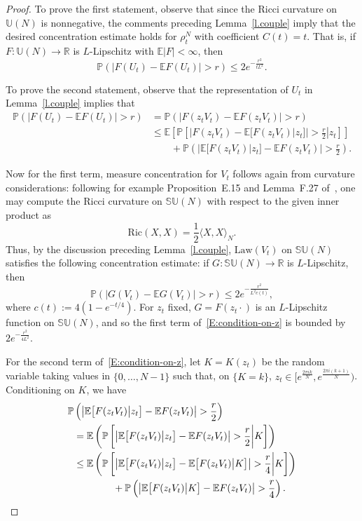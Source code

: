\documentclass[11pt]{article}
\theoremstyle{definition}
\numberwithin{equation}{section}
\numberwithin{figure}{section}
\numberwithin{table}{section}
\newcommand{\Unitary}[1]{\mathbb{U}\left(#1\right)}
\newcommand{\SUnitary}[1]{\mathbb{SU}\left(#1\right)}
\newcommand{\R}{\mathbb{R}}
\newcommand{\E}{\mathbb{E}}
\newcommand{\Prob}{\mathbb{P}}
\begin{document}
\begin{proof}
To prove the first statement, observe that since the Ricci curvature on $\Unitary{N}$ is nonnegative, the comments preceding Lemma~\ref{l.couple} imply that the desired concentration estimate holds for $\rho_t^N$ with coefficient $C(t)=t$. That is, if $F:\Unitary{N}\to\R$ is $L$-Lipschitz with $\mathbb{E}|F|<\infty$, then
\[
\Prob(|F(U_t)-\E F(U_t)|>r)\le 2e^{-\frac{r^2}{tL^2}}.
\]

To prove the second statement, observe that the representation of $U_t$ in Lemma~\ref{l.couple} implies that
\begin{equation}
\begin{split}\label{E:condition-on-z}
\Prob\left(|F(U_t)-\E F(U_t)|>r\right) &=\Prob\left(|F(z_tV_t)-\E F(z_tV_t)|>r\right)\\
&\le\E\left[\Prob\left[\left.\Big|F(z_tV_t)-\E\big[F(z_tV_t)\big|z_t\big]\Big|>\frac{r}{2}\right|z_t\right]\right] \\
&\qquad +\Prob\left(\left|\E\big[F(z_tV_t)\big|z_t\big]-\E F(z_tV_t)\right|>\frac{r}{2}\right).
\end{split}
\end{equation}

Now for the first term, measure concentration for $V_t$ follows again from curvature considerations: following for example Proposition~E.15 and Lemma~F.27 of~\cite{AGZ}, one may compute the Ricci curvature on $\SUnitary{N}$ with respect to the given inner product as
\[
\mathrm{Ric}(X,X) = \frac{1}{2}\langle X,X\rangle_N.
\]
Thus, by the discussion preceding Lemma~\ref{l.couple}, $\mathrm{Law}(V_t)$ on $\SUnitary{N}$ satisfies the following concentration estimate: if $G:\SUnitary{N}\to\R$ is $L$-Lipschitz, then
\[
\Prob(|G(V_t)-\E G(V_t)|>r)\le 2e^{-\frac{r^2}{L^2c(t)}},
\]
where $c(t):=4(1-e^{-t/4})$. For $z_t$ fixed, $G=F(z_t\cdot)$ is an $L$-Lipschitz function on $\SUnitary{N}$, and so the first term of~\eqref{E:condition-on-z} is bounded by $2e^{-\frac{r^2}{4L^2}}$.

For the second term of~\eqref{E:condition-on-z}, let $K=K(z_t)$ be the random variable taking values in $\{0,\ldots,N-1\}$ such that, on $\{K=k\}$, $z_t\in [e^{\frac{2\pi ik}{N}},e^{\frac{2\pi i(k+1)}{N}})$. Conditioning on $K$, we have
\begin{align}
\notag\Prob&\left(\left|\E\big[F(z_tV_t)\big|z_t\big]-\E F(z_tV_t)\right|>\frac{r}{2}\right)\\
&\notag=\E\left(\Prob\left[\left|\E\big[F(z_tV_t)\big|z_t\big] -\E F(z_tV_t)\right|>\frac{r}{2}\bigg|K\right]\right)\\
&\label{e.K}
\le\E\left(\Prob\left[\left|\E\big[F(z_tV_t)\big|z_t\big] -\E \big[F(z_tV_t)\big|K\big]\right|>\frac{r}{4}\bigg|K\right]\right)\\
&\notag\qquad\qquad+\Prob\left(\left|\E\big[F(z_tV_t)\big|K\big] -\E F(z_tV_t)\right|>\frac{r}{4}\right).
\end{align}


\end{proof}
\end{document}
